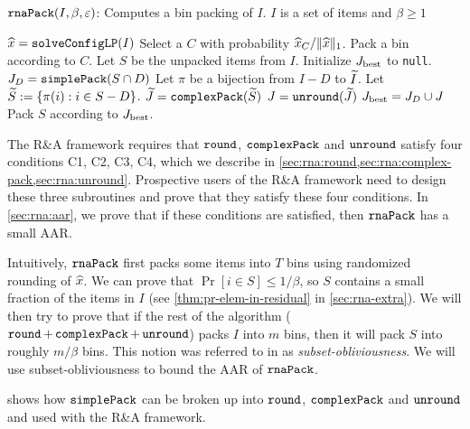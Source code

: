 \begin{algorithm}[htb]
\caption{$\operatorname{\mathtt{rnaPack}}(I, \beta, \varepsilon)$: Computes a bin packing of $I$.
$I$ is a set of  items and $\beta \ge 1$}
\label{algo:rna-pack}
\begin{algorithmic}[1]
\State $\widehat{x} = \operatorname{\mathtt{solveConfigLP}}(I)$
    \State \label{alg-line:rna-pack:rround-choose}Select
        a \config{} $C$ with probability $\widehat{x}_C/\lVert \widehat{x} \rVert_1$.
    \State \label{alg-line:rna-pack:rround-pack}Pack a bin according to $C$.
\EndRepeatN
\State Let $S$ be the unpacked items from $I$.
\State Initialize $J_{\mathrm{best}}$ to \texttt{null}.
    \State $J_D = \operatorname{\mathtt{simplePack}}(S \cap D)$
    \State Let $\pi$ be a bijection from $I-D$ to $\widetilde{I}$.
        Let $\widetilde{S} := \{\pi(i): i \in S-D\}$.
    \State $\widetilde{J} = \operatorname{\mathtt{complexPack}}(\widetilde{S})$
    \State $J = \operatorname{\mathtt{unround}}(\widetilde{J})$
        \State $J_{\mathrm{best}} = J_D \cup J$
    \EndIf
\EndFor
\State Pack $S$ according to $J_{\mathrm{best}}$.
\end{algorithmic}
\end{algorithm}

The R\&A framework requires that $\operatorname{\mathtt{round}}$, $\operatorname{\mathtt{complexPack}}$ and $\operatorname{\mathtt{unround}}$
satisfy four conditions C1, C2, C3, C4, which we describe in
\cref{sec:rna:round,sec:rna:complex-pack,sec:rna:unround}.
Prospective users of the R\&A framework need to design these three subroutines
and prove that they satisfy these four conditions.
In \cref{sec:rna:aar}, we prove that if these conditions are satisfied,
then $\operatorname{\mathtt{rnaPack}}$ has a small AAR.

Intuitively, $\operatorname{\mathtt{rnaPack}}$ first packs some items into $T$ bins using randomized rounding of $\widehat{x}$.
We can prove that $\Pr[i \in S] \le 1/\beta$,
so $S$ contains a small fraction of the items in $I$
(see \cref{thm:pr-elem-in-residual} in \cref{sec:rna-extra}).
We will then try to prove that if the rest of the algorithm
($\operatorname{\mathtt{round}} + \operatorname{\mathtt{complexPack}} + \operatorname{\mathtt{unround}}$)
packs $I$ into $m$ bins, then it will pack $S$ into roughly $m/\beta$ bins.
This notion was referred to in \cite{rna} as \emph{subset-obliviousness}.
We will use subset-obliviousness to bound the AAR of $\operatorname{\mathtt{rnaPack}}$.

 shows how $\operatorname{\mathtt{simplePack}}$
can be broken up into $\operatorname{\mathtt{round}}$, $\operatorname{\mathtt{complexPack}}$ and $\operatorname{\mathtt{unround}}$
and used with the R\&A framework.

